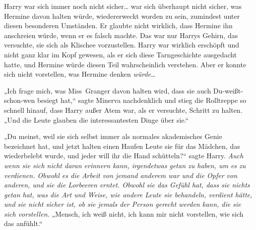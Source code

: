 Harry war sich immer noch nicht sicher… war sich überhaupt nicht sicher, was Hermine davon halten würde, wiedererweckt worden zu sein, zumindest unter diesen besonderen Umständen. Er glaubte nicht wirklich, dass Hermine ihn anschreien würde, wenn er es falsch machte. Das war nur Harrys Gehirn, das versuchte, sie sich als Klischee vorzustellen. Harry war wirklich erschöpft und nicht ganz klar im Kopf gewesen, als er sich diese Tarngeschichte ausgedacht hatte, und Hermine würde diesen Teil wahrscheinlich verstehen. Aber er konnte sich nicht vorstellen, was Hermine denken \emph{würde}…

„Ich frage mich, was Miss~Granger davon halten wird, dass sie auch Du-weißt-schon-wen besiegt hat,“ sagte Minerva nachdenklich und stieg die Rolltreppe so schnell hinauf, dass Harry außer Atem war, als er versuchte, Schritt zu halten.
„Und die Leute glauben die interessantesten Dinge über sie.“

„Du meinst, weil sie sich selbst immer als normales akademisches Genie bezeichnet hat, und jetzt halten einen Haufen Leute sie für das Mädchen, das wiederbelebt wurde, und jeder will ihr die Hand schütteln?“ sagte Harry.
\emph{Auch wenn sie sich nicht daran erinnern kann, irgendetwas getan zu haben, um es zu verdienen. Obwohl es die Arbeit von jemand anderem war und die Opfer von anderen, und sie die Lorbeeren erntet. Obwohl sie das Gefühl hat, dass sie nichts getan hat, was die Art und Weise, wie andere Leute sie behandeln, verdient hätte, und sie nicht sicher ist, ob sie jemals der Person gerecht werden kann, die sie sich vorstellen.}
„Mensch, ich weiß nicht, ich kann mir nicht vorstellen, wie sich das anfühlt.“

